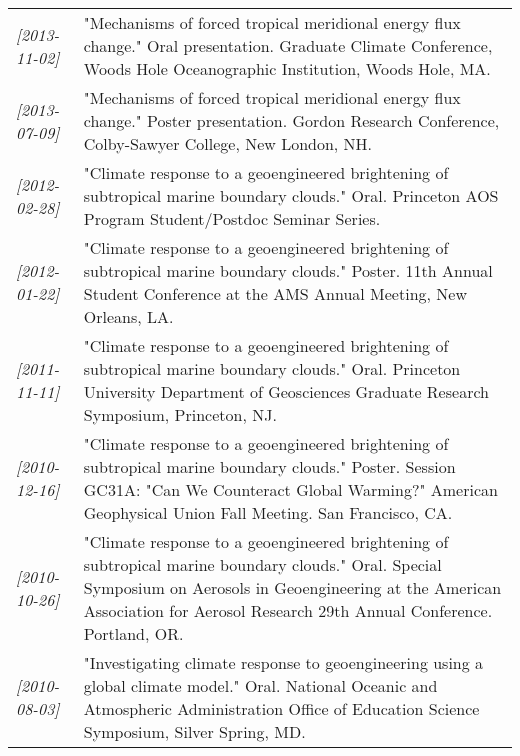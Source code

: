 \documentclass[12pt,letterpaper]{shillcv}
\begin{document}
\begin{center}
\begin{tabularx}{\textwidth}{lX}
\textit{[2013-11-02]} & "Mechanisms of forced tropical meridional energy flux change."  Oral presentation.  Graduate Climate Conference, Woods Hole Oceanographic Institution, Woods Hole, MA.\\
\textit{[2013-07-09]} & "Mechanisms of forced tropical meridional energy flux change."  Poster presentation.  Gordon Research Conference, Colby-Sawyer College, New London, NH.\\
\textit{[2012-02-28]} & "Climate response to a geoengineered brightening of subtropical marine boundary clouds."  Oral.  Princeton AOS Program Student/Postdoc Seminar Series.\\
\textit{[2012-01-22]} & "Climate response to a geoengineered brightening of subtropical marine boundary clouds."  Poster.  11th Annual Student Conference at the AMS Annual Meeting, New Orleans, LA.\\
\textit{[2011-11-11]} & "Climate response to a geoengineered brightening of subtropical marine boundary clouds."  Oral.  Princeton University Department of Geosciences Graduate Research Symposium, Princeton, NJ.\\
\textit{[2010-12-16]} & "Climate response to a geoengineered brightening of subtropical marine boundary clouds."  Poster.  Session GC31A: "Can We Counteract Global Warming?" American Geophysical Union Fall Meeting.  San Francisco, CA.\\
\textit{[2010-10-26]} & "Climate response to a geoengineered brightening of subtropical marine boundary clouds."  Oral.  Special Symposium on Aerosols in Geoengineering at the American Association for Aerosol Research 29th Annual Conference.  Portland, OR.\\
\textit{[2010-08-03]} & "Investigating climate response to geoengineering using a global climate model."  Oral.  National Oceanic and Atmospheric Administration Office of Education Science Symposium, Silver Spring, MD.\\
\end{tabularx}
\end{center}
\end{document}
